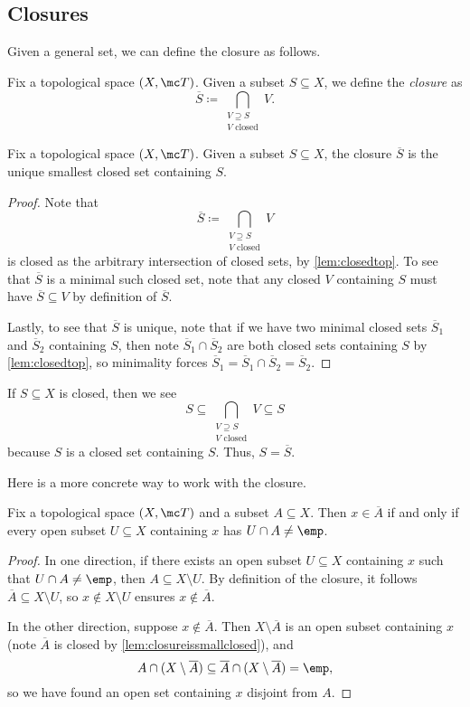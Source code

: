 \documentclass[../notes.tex]{subfiles}
\begin{document}
\subsection{Closures}
Given a general set, we can define the closure as follows.
\begin{definition}[Closure]
	Fix a topological space $(X,\mc T)$. Given a subset $S\subseteq X$, we define the \textit{closure} as
	\[\overline S\coloneqq\bigcap_{\substack{V\supseteq S\\V\text{ closed}}}V.\]
\end{definition}
\begin{lemma} \label{lem:closureissmallclosed}
	Fix a topological space $(X,\mc T)$. Given a subset $S\subseteq X$, the closure $\overline S$ is the unique smallest closed set containing $S$.
\end{lemma}
\begin{proof}
	Note that
	\[\overline S\coloneqq\bigcap_{\substack{V\supseteq S\\V\text{ closed}}}V\]
	is closed as the arbitrary intersection of closed sets, by \autoref{lem:closedtop}. To see that $\overline S$ is a minimal such closed set, note that any closed $V$ containing $S$ must have $\overline S\subseteq V$ by definition of $\overline S$.
	
	Lastly, to see that $\overline S$ is unique, note that if we have two minimal closed sets $\overline S_1$ and $\overline S_2$ containing $S$, then note $\overline S_1\cap\overline S_2$ are both closed sets containing $S$ by \autoref{lem:closedtop}, so minimality forces $\overline S_1=\overline S_1\cap\overline S_2=\overline S_2$.
\end{proof}
\begin{example} \label{ex:closureofclosed}
	If $S\subseteq X$ is closed, then we see
	\[S\subseteq\bigcap_{\substack{V\supseteq S\\V\text{ closed}}}V\subseteq S\]
	because $S$ is a closed set containing $S$. Thus, $S=\overline S$.
\end{example}
Here is a more concrete way to work with the closure.
\begin{lemma} \label{lem:betterclosure}
	Fix a topological space $(X,\mc T)$ and a subset $A\subseteq X$. Then $x\in\overline A$ if and only if every open subset $U\subseteq X$ containing $x$ has $U\cap A\ne\emp$.
\end{lemma}
\begin{proof}
	In one direction, if there exists an open subset $U\subseteq X$ containing $x$ such that $U\cap A\ne\emp$, then $A\subseteq X\setminus U$. By definition of the closure, it follows $\overline A\subseteq X\setminus U$, so $x\notin X\setminus U$ ensures $x\notin\overline A$.

	In the other direction, suppose $x\notin\overline A$. Then $X\setminus\overline A$ is an open subset containing $x$ (note $\overline A$ is closed by \autoref{lem:closureissmallclosed}), and
	\[A\cap(X\setminus\overline A)\subseteq\overline A\cap(X\setminus\overline A)=\emp,\]
	so we have found an open set containing $x$ disjoint from $A$.
\end{proof}
\end{document}
